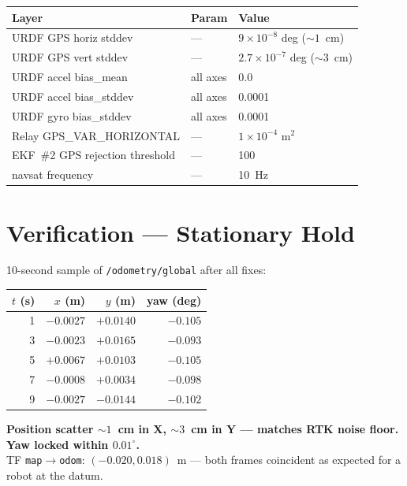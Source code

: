 \documentclass[11pt,a4paper]{article}
\newcommand{\good}[1]{\textcolor{good}{\textbf{#1}}}
\begin{document}
\begin{table}[H]
\centering
\small
\begin{tabular}{@{}lll@{}}
\toprule
Layer & Param & Value \\
\midrule
URDF GPS horiz stddev & --- & $9\!\times\!10^{-8}$ deg ($\sim\!1$~cm) \\
URDF GPS vert stddev  & --- & $2.7\!\times\!10^{-7}$ deg ($\sim\!3$~cm) \\
URDF accel bias\_mean & all axes & 0.0 \\
URDF accel bias\_stddev & all axes & 0.0001 \\
URDF gyro bias\_stddev  & all axes & 0.0001 \\
Relay GPS\_VAR\_HORIZONTAL & --- & $1\!\times\!10^{-4}$ m$^2$ \\
EKF~\#2 GPS rejection threshold & --- & 100 \\
navsat frequency & --- & 10~Hz \\
\bottomrule
\end{tabular}
\end{table}

\section{Verification --- Stationary Hold}

10-second sample of \texttt{/odometry/global} after all fixes:

\begin{table}[H]
\centering
\small
\begin{tabular}{@{}rrrr@{}}
\toprule
$t$ (s) & $x$ (m) & $y$ (m) & yaw (deg) \\
\midrule
1  & $-0.0027$ & $+0.0140$ & $-0.105$ \\
3  & $-0.0023$ & $+0.0165$ & $-0.093$ \\
5  & $+0.0067$ & $+0.0103$ & $-0.105$ \\
7  & $-0.0008$ & $+0.0034$ & $-0.098$ \\
9  & $-0.0027$ & $-0.0144$ & $-0.102$ \\
\bottomrule
\end{tabular}
\end{table}

\noindent
\good{Position scatter $\sim\!\!1$~cm in X, $\sim\!\!3$~cm in Y --- matches RTK noise floor.
Yaw locked within $0.01^\circ$.}\\

\noindent
TF \texttt{map$\to$odom}: $(-0.020, 0.018)$~m --- both frames coincident as expected for
a robot at the datum.
\end{document}
